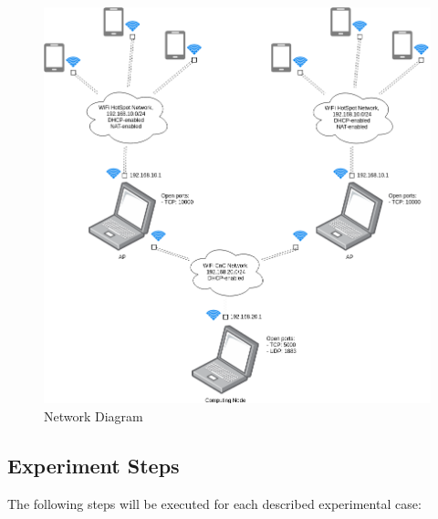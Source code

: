 \begin{figure}[H]
	\centering
	\includegraphics[width=\linewidth, keepaspectratio]{images/Deployment Diagram-Network_Diagram.png}
\caption{Network Diagram}
\label{fig:network-diagram}
\end{figure}

\hypertarget{experiment-steps}{%
\subsection{Experiment Steps}\label{experiment-steps}}

The following steps will be executed for each described experimental
case:


